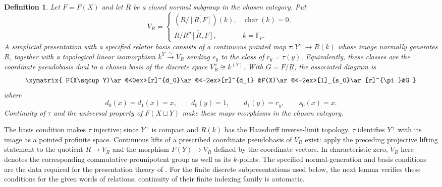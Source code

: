 \documentclass[11pt,a4paper]{article}
\newtheorem{definition}[theorem]{Definition} %
\begin{document}
\begin{definition}\label{d7}
Let $F=F(X)$ and let $R$ be a closed normal subgroup in the chosen
category.  Put
\[
 V_R=\begin{cases}
 (R/\overline{[R,F]})(k),&\operatorname{char}(k)=0,\\
 R/\overline{R^p[R,F]},&k=\mathbb F_p.
 \end{cases}
\]
A simplicial presentation with a specified relator basis consists of
a continuous pointed map $\tau:Y^+\to R(k)$ whose image normally
generates $R$, together with a topological linear isomorphism
$k^Y\xrightarrow{\sim}V_R$ sending $e_y$ to the class of
$r_y=\tau(y)$.  Equivalently, these classes are the coordinate
pseudobasis dual to a chosen basis of the discrete space
$V_R^\vee\cong k^{(Y)}$.  With $G=F/R$, the associated diagram is
\begin{equation}
\xymatrix{
 F(X\sqcup Y)\ar@<0ex>[r]^{d_0}\ar@<-2ex>[r]^{d_1}
 &F(X)\ar@<-2ex>[l]_{s_0}\ar[r]^{\pi}&G
}\label{5}
\end{equation}
where
\[
 d_0(x)=d_1(x)=x,\qquad d_0(y)=1,\qquad d_1(y)=r_y,
 \qquad s_0(x)=x.
\]
Continuity of $\tau$ and the universal property of $F(X\sqcup Y)$
make these maps morphisms in the chosen category.
\end{definition}

The basis condition makes $\tau$ injective; since $Y^+$ is compact
and $R(k)$ has the Hausdorff inverse-limit topology, $\tau$ identifies
$Y^+$ with its image as a pointed profinite space.
Continuous lifts of a prescribed coordinate pseudobasis of $V_R$
exist: apply the preceding projective lifting statement to the
quotient $R\to V_R$ and the morphism $F(Y)\to V_R$ defined by the
coordinate vectors.  In characteristic zero, $V_R$ here denotes the
corresponding commutative prounipotent group as well as its $k$-points.
The specified normal-generation and basis conditions are the data
required for the presentation theory of
\cite[Section~4.5]{Mikh2023}.  For the finite discrete subpresentations
used below, the next lemma verifies these conditions for the given
words of relations; continuity of their finite indexing family is
automatic.
\end{document}
